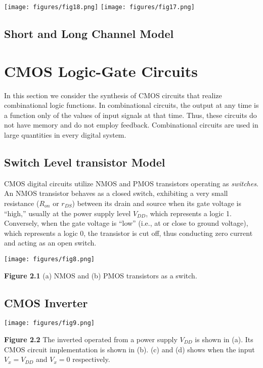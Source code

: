 \documentclass[12pt]{article}
\begin{document}
    \begin{center}
        \texttt{[image: figures/fig18.png]}
        \texttt{[image: figures/fig17.png]}
    \end{center}

    \subsection*{Short and Long Channel Model}

    \section{CMOS Logic-Gate Circuits}

    In this section we consider the synthesis of CMOS circuits that realize combinational logic 
    functions. In combinational circuits, the output at any time is a function only of the values 
    of input signals at that time. Thus, these circuits do not have memory and do not employ 
    feedback. Combinational circuits are used in large quantities in every digital system.
    
    \subsection*{Switch Level transistor Model}

    CMOS digital circuits utilize NMOS and PMOS transistors operating as \textit{switches}.
    An NMOS transistor behaves as a closed switch, exhibiting a very small resistance ($R_{on}$ or 
    $r_{DS}$) between its drain and source when its gate voltage is “high,” usually at the power 
    supply level $V_{DD}$, which represents a logic 1. Conversely, when the gate voltage is “low” 
    (i.e., at or close to ground voltage), which represents a logic 0, the transistor is cut off, 
    thus conducting zero current and acting as an open switch.
    
    \begin{center}
        \texttt{[image: figures/fig8.png]}
    \end{center}
    \textbf{Figure 2.1} (a) NMOS and (b) PMOS transistors as a switch.
    
    \subsection*{CMOS Inverter}

    \begin{center}
        \texttt{[image: figures/fig9.png]}
    \end{center}
    \textbf{Figure 2.2} The inverted operated from a power supply $V_{DD}$ is shown in (a). Its 
    CMOS circuit implementation is shown in (b). (c) and (d) shows when the input $V_x = V_{DD}$ 
    and $V_x = 0$ respectively.
\end{document}
